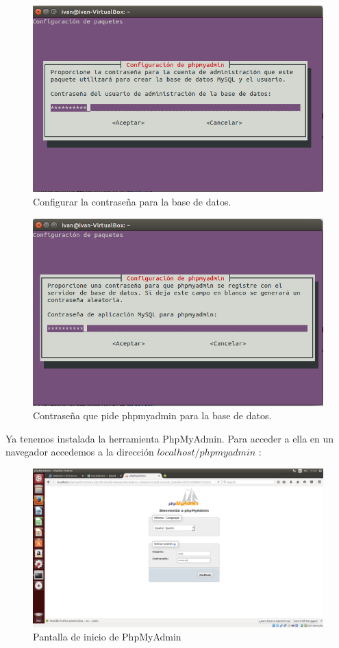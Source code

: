 \begin{itemize}
	\begin{figure}[H]
		\centering
		\includegraphics[width=0.7\linewidth]{PhpMyadminContrasenaBaseDatos}
		\caption[Contraseña base de datos]{Configurar la contraseña para la base de datos.}
		\label{fig:PhpMyadminContraseñaBaseDatos}
	\end{figure}
	
	\begin{figure}[H]
		\centering
		\includegraphics[width=0.7\linewidth]{PhpmyadminContrasena2}
		\caption[Contraseña 2 phpmyadmin]{Contraseña que pide phpmyadmin para la base de datos.}
		\label{fig:PhpmyadminContraseña2}
	\end{figure}
	
	Ya tenemos instalada la herramienta PhpMyAdmin. Para acceder a ella en un navegador accedemos a la dirección $localhost/phpmyadmin$ :\\
	
    \begin{figure}[H]
		\centering
		\includegraphics[width=0.7\linewidth]{PHPMyadminpantallaInicio}
		\caption[Phpmyadmin pantalla inicio]{Pantalla de inicio de PhpMyAdmin}
		\label{fig:PHPMyadminpantallaInicio}
	\end{figure}
	

\end{itemize}
